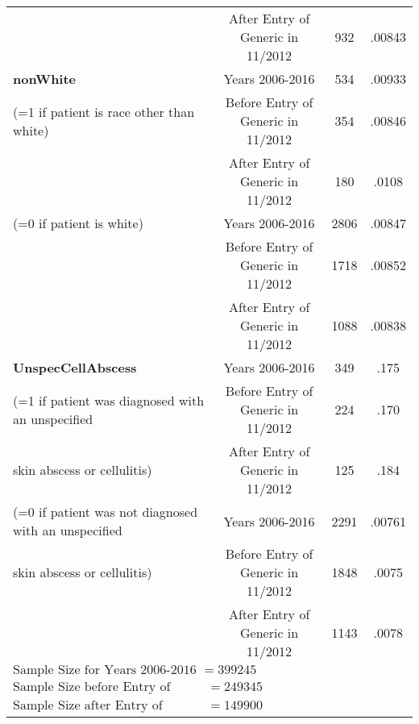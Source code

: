 \begin{table}[htbp]
\begin{tabular}{l*{3}{c}}
                                                        &     After Entry of Generic in 11/2012&      932 &     .00843\\
[1em]
\textbf{nonWhite}                                       &     Years 2006-2016&             534&      .00933\\
(=1 if patient is race other than white)                &     Before Entry of Generic in 11/2012&     354&      .00846\\
                                                        &     After Entry of Generic in 11/2012&      180&      .0108\\
[1em]
(=0 if patient is white)                                &     Years 2006-2016&             2806&      .00847\\
                                                        &     Before Entry of Generic in 11/2012&     1718&      .00852\\
                                                        &     After Entry of Generic in 11/2012&      1088&      .00838\\
[1em]
\textbf{UnspecCellAbscess}                              &     Years 2006-2016&             349 &      .175\\
(=1 if patient was diagnosed with an unspecified        &     Before Entry of Generic in 11/2012&     224 &      .170\\
 skin abscess or cellulitis)                            &     After Entry of Generic in 11/2012&      125  &      .184\\
[1em]
(=0 if patient was not diagnosed with an unspecified    &     Years 2006-2016&             2291 &      .00761\\
skin abscess or cellulitis)                             &     Before Entry of Generic in 11/2012&     1848 &      .0075\\
                                                        &     After Entry of Generic in 11/2012&      1143  &      .0078\\
\hline
$\text{Sample Size for Years 2006-2016 }= 399245$\\
$\text{Sample Size before Entry of Generic in 11/2012} = 249345$\\
$\text{Sample Size after Entry of Generic in 11/2012} = 149900$\\
\hline\hline
\end{tabular}
\label{tab:Table4.4}
\end{table}

